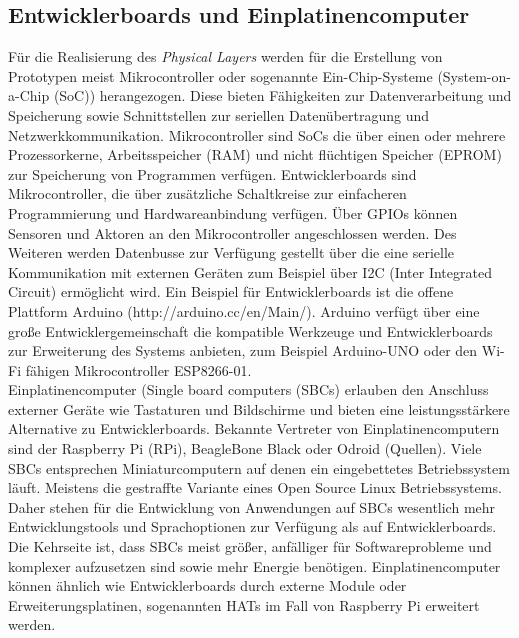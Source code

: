 \documentclass[BMR,Bachelor,ngerman]{twbook}%
\begin{document}
\subsection{Entwicklerboards und Einplatinencomputer} 
Für die Realisierung des \emph{Physical Layers} werden für die Erstellung von Prototypen meist Mikrocontroller oder sogenannte Ein-Chip-Systeme (System-on-a-Chip (SoC)) herangezogen. Diese bieten Fähigkeiten zur Datenverarbeitung und Speicherung sowie Schnittstellen zur seriellen Datenübertragung und Netzwerkkommunikation. Mikrocontroller sind SoCs die über einen oder mehrere Prozessorkerne, Arbeitsspeicher (RAM) und nicht flüchtigen Speicher (EPROM) zur Speicherung von Programmen verfügen. Entwicklerboards sind Mikrocontroller, die über zusätzliche Schaltkreise zur einfacheren Programmierung und Hardwareanbindung verfügen. Über \acfp{GPIO} können Sensoren und Aktoren an den Mikrocontroller angeschlossen werden. Des Weiteren werden Datenbusse zur Verfügung gestellt über die eine serielle Kommunikation mit externen Geräten zum Beispiel über I2C (Inter Integrated Circuit) ermöglicht wird. Ein Beispiel für Entwicklerboards ist die offene Plattform Arduino (http://arduino.cc/en/Main/). Arduino verfügt über eine große Entwicklergemeinschaft die kompatible Werkzeuge und Entwicklerboards zur Erweiterung des Systems anbieten, zum Beispiel Arduino-UNO oder den Wi-Fi fähigen Mikrocontroller ESP8266-01.\\\newline
Einplatinencomputer (Single board computers (SBCs) erlauben den Anschluss externer Geräte wie Tastaturen und Bildschirme und bieten eine leistungsstärkere Alternative zu Entwicklerboards. Bekannte Vertreter von Einplatinencomputern sind der Raspberry Pi (RPi), BeagleBone Black oder Odroid {\color{red}(Quellen)}. Viele SBCs entsprechen Miniaturcomputern auf denen ein eingebettetes Betriebssystem läuft. Meistens die gestraffte Variante eines Open Source Linux Betriebssystems. Daher stehen für die Entwicklung von Anwendungen auf SBCs wesentlich mehr Entwicklungstools und Sprachoptionen zur Verfügung als auf Entwicklerboards. Die Kehrseite ist, dass SBCs meist größer, anfälliger für Softwareprobleme und komplexer aufzusetzen sind sowie mehr Energie benötigen. Einplatinencomputer können ähnlich wie Entwicklerboards durch externe Module oder Erweiterungsplatinen, sogenannten HATs im Fall von Raspberry Pi erweitert werden.
%
\end{document}
